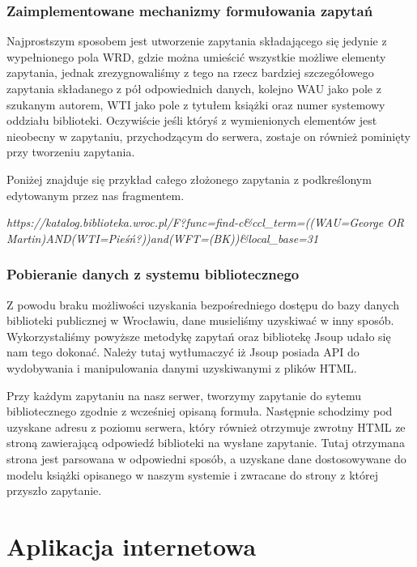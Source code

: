 \documentclass{report}
\begin{document}
			\subsubsection{Zaimplementowane mechanizmy formułowania zapytań}
				
				Najprostszym sposobem jest utworzenie zapytania składającego się jedynie z wypełnionego pola WRD, gdzie można umieścić wszystkie możliwe elementy zapytania, jednak zrezygnowaliśmy z tego na rzecz bardziej szczegółowego zapytania składanego z pół odpowiednich danych, kolejno WAU jako pole z szukanym autorem, WTI jako pole z tytułem książki oraz numer systemowy oddziału biblioteki. Oczywiście jeśli któryś z wymienionych elementów jest nieobecny w zapytaniu, przychodzącym do serwera, zostaje on również pominięty przy tworzeniu zapytania.
				
				Poniżej znajduje się przykład całego złożonego zapytania z podkreślonym edytowanym przez nas fragmentem.
\vspace{.5cm}				

\textit{https://katalog.biblioteka.wroc.pl/F?func=find-c\&ccl\_term={((WAU=George OR Martin)AND(WTI=Pieśń?))and(WFT=(BK))\&local\_base=31}}		

			
			
			\subsubsection{Pobieranie danych z systemu bibliotecznego}
			
			Z powodu braku możliwości uzyskania bezpośredniego dostępu do bazy danych biblioteki publicznej w Wrocławiu, dane musieliśmy uzyskiwać w inny sposób. Wykorzystaliśmy powyższe metodykę zapytań oraz bibliotekę Jsoup udało się nam tego dokonać. Należy tutaj wytłumaczyć iż Jsoup posiada API do wydobywania i manipulowania danymi uzyskiwanymi z plików HTML.
			
			Przy każdym zapytaniu na nasz serwer, tworzymy zapytanie do sytemu bibliotecznego zgodnie z wcześniej opisaną formuła. Następnie schodzimy pod uzyskane adresu z poziomu serwera, który również otrzymuje zwrotny HTML ze stroną zawierającą odpowiedź biblioteki na wysłane zapytanie. Tutaj otrzymana strona jest parsowana w odpowiedni sposób, a uzyskane dane dostosowywane do modelu książki opisanego w naszym systemie i zwracane do strony z której przyszło zapytanie.
		
	\section{Aplikacja internetowa}
	
\end{document}
